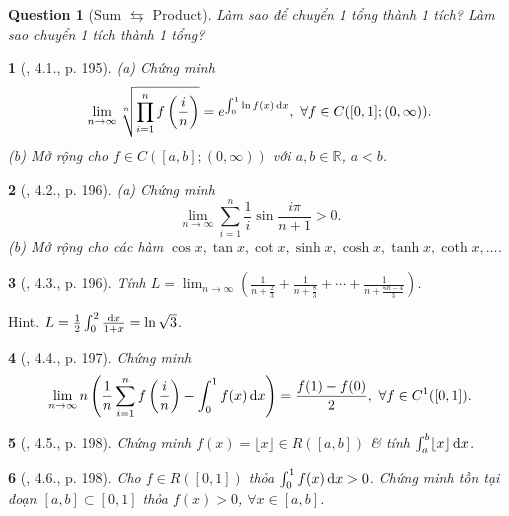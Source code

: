 \documentclass{article}
\newtheorem{baitoan}{}
\newtheorem{question}{Question}
\begin{document}
\begin{question}[Sum $\leftrightarrows$ Product]
	Làm sao để chuyển 1 tổng thành 1 tích? Làm sao chuyển 1 tích thành 1 tổng?
\end{question}

\begin{baitoan}[\cite{Quoc_Long_Dat_Nam_VMC}, 4.1., p. 195]
	(a) Chứng minh
	\begin{equation*}
		\lim_{n\to\infty} \sqrt[n]{\prod_{i=1}^n f\left(\frac{i}{n}\right)} = e^{\int_0^1 \ln f(x)\,{\rm d}x},\ \forall f\in C([0,1];(0,\infty)).
	\end{equation*}
	(b) Mở rộng cho $f\in C([a,b];(0,\infty))$ với $a,b\in\mathbb{R}$, $a < b$.
\end{baitoan}

\begin{baitoan}[\cite{Quoc_Long_Dat_Nam_VMC}, 4.2., p. 196]
	(a) Chứng minh
	\begin{equation*}
		\lim_{n\to\infty} \sum_{i=1}^{n} \frac{1}{i}\sin\frac{i\pi}{n + 1} > 0.
	\end{equation*}
	(b) Mở rộng cho các hàm $\cos x,\tan x,\cot x,\sinh x,\cosh x,\tanh x,\coth x,\ldots$.
\end{baitoan}

\begin{baitoan}[\cite{Quoc_Long_Dat_Nam_VMC}, 4.3., p. 196]
	Tính $L = \lim_{n\to\infty} \left(\frac{1}{n + \frac{2}{3}} + \frac{1}{n + \frac{8}{3}} + \cdots + \frac{1}{n + \frac{6n - 4}{3}}\right)$.
\end{baitoan}
{\sf Hint.} $L = \frac{1}{2}\int_0^2 \frac{{\rm d}x}{1 + x} = \ln\sqrt{3}$.

\begin{baitoan}[\cite{Quoc_Long_Dat_Nam_VMC}, 4.4., p. 197]
	Chứng minh
	\begin{equation*}
		\lim_{n\to\infty} n\left(\frac{1}{n}\sum_{i=1}^n f\left(\frac{i}{n}\right) - \int_0^1 f(x)\,{\rm d}x\right) = \frac{f(1) - f(0)}{2},\ \forall f\in C^1([0,1]).
	\end{equation*}
\end{baitoan}

\begin{baitoan}[\cite{Quoc_Long_Dat_Nam_VMC}, 4.5., p. 198]
	Chứng minh $f(x) = \lfloor x\rfloor\in R([a,b])$ \& tính $\int_a^b \lfloor x\rfloor\,{\rm d}x$.
\end{baitoan}

\begin{baitoan}[\cite{Quoc_Long_Dat_Nam_VMC}, 4.6., p. 198]
	Cho $f\in R([0,1])$ thỏa $\int_0^1 f(x)\,{\rm d}x > 0$. Chứng minh tồn tại đoạn $[a,b]\subset[0,1]$ thỏa $f(x) > 0$, $\forall x\in[a,b]$.
\end{baitoan}
\end{document}
